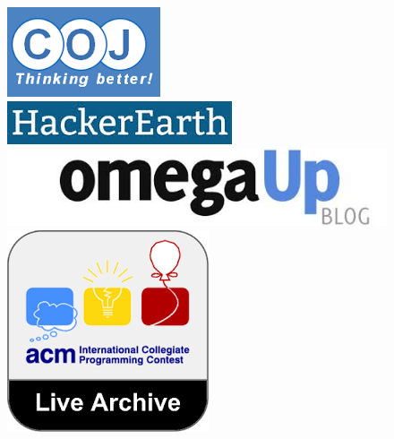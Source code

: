 \documentclass{beamer}
\begin{document}
\begin{frame}
\begin{figure}[!htb]
      \href{http://coj.uci.cu/index.xhtml}{\includegraphics[width=\linewidth]{images/judges/coj}}
     \endminipage\hfill
     \href{https://www.hackerearth.com/}{ \includegraphics[width=\linewidth]{images/judges/hackerearth}}
     \endminipage\hfill
     \href{https://omegaup.com/}{ \includegraphics[width=\linewidth]{images/judges/omegaup}}
     \endminipage\hfill
     \href{https://icpcarchive.ecs.baylor.edu/}{ \includegraphics[width=\linewidth]{images/judges/livearchive}}
     \endminipage\hfill
	\end{figure}
\end{frame}
\end{document}
